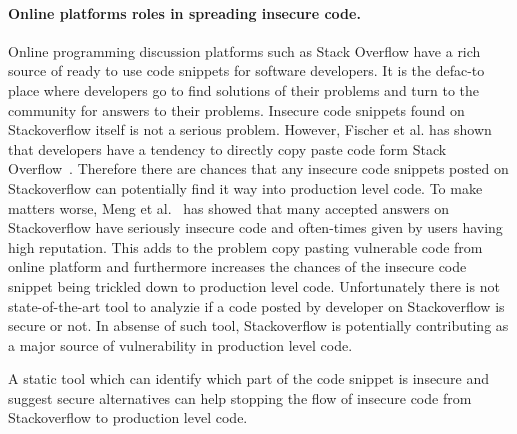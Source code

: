    \paragraph{Online platforms roles in spreading insecure code.} Online programming discussion platforms such as Stack Overflow have a rich source of ready to use code snippets for software developers. It is the defac-to place where developers go to find solutions of their problems and turn to the community for answers to their problems. 
   Insecure code snippets found on Stackoverflow itself is not a serious problem. However,  
   Fischer et al. has shown that developers have a tendency to directly copy paste code form Stack Overflow~\cite{fischer2017stack}. Therefore there are chances that any insecure code snippets posted on Stackoverflow can potentially find it way into production level code. To make matters worse, Meng et al.~\cite{meng2018secure} has showed that many accepted answers on Stackoverflow have seriously insecure code and often-times given by users having high reputation. This adds to the problem copy pasting vulnerable code from online platform and furthermore increases the chances of the insecure code snippet being trickled down to production level code. 
   Unfortunately there is not state-of-the-art tool to analyzie if a code posted by developer on Stackoverflow is secure or not. In absense of such tool, Stackoverflow is potentially contributing as a major source of vulnerability in production level code.  
   
   A static tool which can identify which part of the code snippet is insecure and suggest secure alternatives can help stopping the flow of insecure code from Stackoverflow to production level code.

